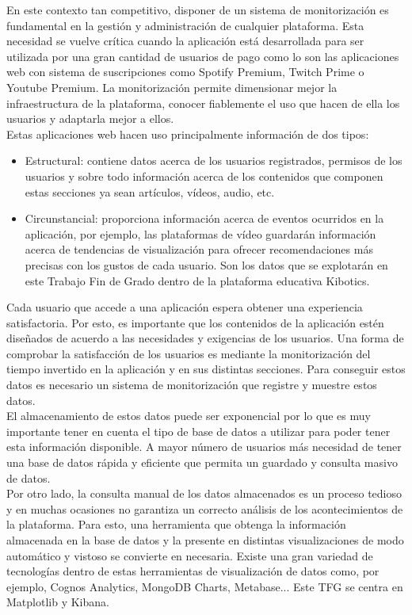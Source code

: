 \documentclass[a4paper, 12pt]{book}
\begin{document}
		En este contexto tan competitivo, disponer de un sistema de monitorización es fundamental en la gestión y administración de cualquier plataforma. Esta necesidad se vuelve crítica cuando la aplicación está desarrollada para ser utilizada por una gran cantidad de usuarios de pago como lo son las aplicaciones web con sistema de suscripciones como Spotify Premium, Twitch Prime o Youtube Premium. La monitorización permite dimensionar mejor la infraestructura de la plataforma, conocer fiablemente el uso que hacen de ella los usuarios y adaptarla mejor a ellos. \\
		
		Estas aplicaciones web hacen uso principalmente información de dos tipos:
		\begin{itemize}
			\item Estructural: contiene datos acerca de los usuarios registrados, permisos de los usuarios y sobre todo información acerca de los contenidos que componen estas secciones ya sean artículos, vídeos, audio, etc.
			
			\item Circunstancial: proporciona información acerca de eventos ocurridos en la aplicación, por ejemplo, las plataformas de vídeo guardarán información acerca de tendencias de visualización para ofrecer recomendaciones más precisas con los gustos de cada usuario. Son los datos que se explotarán en este Trabajo Fin de Grado dentro de la plataforma educativa Kibotics.
		\end{itemize}
		
		Cada usuario que accede a una aplicación espera obtener una experiencia satisfactoria. Por esto, es importante que los contenidos de la aplicación estén diseñados de acuerdo a las necesidades y exigencias de los usuarios. Una forma de comprobar la satisfacción de los usuarios es mediante la monitorización del tiempo invertido en la aplicación y en sus distintas secciones. Para conseguir estos datos es necesario un sistema de monitorización que registre y muestre estos datos. \\
		
		El almacenamiento de estos datos puede ser exponencial por lo que es muy importante tener en cuenta el tipo de base de datos a utilizar para poder tener esta información disponible. A mayor número de usuarios más necesidad de tener una base de datos rápida y eficiente que permita un guardado y consulta masivo de datos. \\
		
		Por otro lado, la consulta manual de los datos almacenados es un proceso tedioso y en muchas ocasiones no garantiza un correcto análisis de los acontecimientos de la plataforma. Para esto, una herramienta que obtenga la información almacenada en la base de datos y la presente en distintas visualizaciones de modo automático y vistoso se convierte en necesaria. Existe una gran variedad de tecnologías dentro de estas herramientas de visualización de datos como, por ejemplo, Cognos Analytics, MongoDB Charts, Metabase... Este TFG se centra en Matplotlib y Kibana.
	
\end{document}
